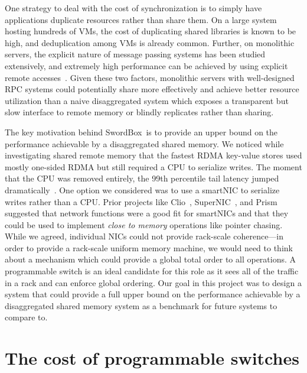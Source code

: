 \documentclass[12pt]{ucsddissertation}
\newcommand{\sword}{SwordBox}
\begin{document}
One strategy to deal with the cost of synchronization is to simply have applications duplicate
resources rather than share them. On a large system hosting hundreds of VMs, the cost of duplicating
shared libraries is known to be high, and deduplication among VMs is already common. Further, on
monolithic servers, the explicit nature of message passing systems has been studied extensively, and
extremely high performance can be achieved by using explicit remote accesses~\cite{herd, erpc}.
Given these two factors, monolithic servers with well-designed RPC systems could potentially share
more effectively and achieve better resource utilization than a naive disaggregated system which
exposes a transparent but slow interface to remote memory or blindly replicates rather than sharing.

The key motivation behind \sword\ is to provide an upper bound on the performance achievable by a
disaggregated shared memory. We noticed while investigating shared remote memory that the fastest
RDMA key-value stores used mostly one-sided RDMA but still required a CPU to serialize writes. The
moment that the CPU was removed entirely, the 99th percentile tail latency jumped
dramatically~\cite{clover}. One option we considered was to use a smartNIC to serialize writes
rather than a CPU. Prior projects like Clio~\cite{clio}, SuperNIC~\cite{supernic}, and
Prism~\cite{prism} suggested that network functions were a good fit for smartNICs and that they
could be used to implement \textit{close to memory} operations like pointer chasing. While we
agreed, individual NICs could not provide rack-scale coherence—in order to provide a rack-scale
uniform memory machine, we would need to think about a mechanism which could provide a global total
order to all operations. A programmable switch is an ideal candidate for this role as it sees all of
the traffic in a rack and can enforce global ordering. Our goal in this project was to design a
system that could provide a full upper bound on the performance achievable by a disaggregated shared
memory system as a benchmark for future systems to compare to.



% 



% 
% 

\section{The cost of programmable switches}
\end{document}
